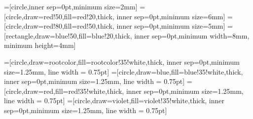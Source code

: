 =[circle,inner sep=0pt,minimum size=2mm]
=[circle,draw=red!50,fill=red!20,thick,
                   inner sep=0pt,minimum size=6mm]
=[circle,draw=red!80,fill=red!50,thick,
                   inner sep=0pt,minimum size=5mm]
=[rectangle,draw=blue!50,fill=blue!20,thick,
                        inner sep=0pt,minimum width=8mm, minimum
                   height=4mm]

=[circle,draw=rootcolor,fill=rootcolor!35!white,thick,
                   inner sep=0pt,minimum size=1.25mm, line width =
                   0.75pt]
=[circle,draw=blue,fill=blue!35!white,thick,
                   inner sep=0pt,minimum size=1.25mm, line width =
                   0.75pt]
=[circle,draw=red,fill=red!35!white,thick,
                   inner sep=0pt,minimum size=1.25mm, line width =
                   0.75pt]
=[circle,draw=violet,fill=violet!35!white,thick,
                   inner sep=0pt,minimum size=1.25mm, line width =
                   0.75pt]


\makeatletter 



\makeatother 
